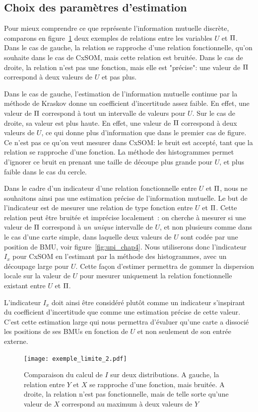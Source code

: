 \documentclass[../main]{subfiles}
\begin{document}
\subsection{Choix des paramètres d'estimation}

Pour mieux comprendre ce que représente l'information mutuelle discrète, comparons en figure~\ref{fig:exemple-limite} deux exemples de relations entre les variables $U$ et $\Pi$.
Dans le cas de gauche, la relation se rapproche d'une relation fonctionnelle, qu'on souhaite dans le cas de CxSOM, mais cette relation est bruitée. Dans le cas de droite, la relation n'est pas une fonction, mais elle est "précise": une valeur de $\Pi$ correspond à deux valeurs de $U$ et pas plus.

Dans le cas de gauche, l'estimation de l'information mutuelle continue par la méthode de Kraskov donne un coefficient d'incertitude assez faible. 
En effet, une valeur de $\Pi$ correspond à tout un intervalle de valeurs pour $U$. Sur le cas de droite, sa valeur est plus haute. En effet, une valeur de $\Pi$ correspond à deux valeurs de $U$, ce qui donne plus d'information que dans le premier cas de figure. Ce n'est pas ce qu'on veut mesurer dans CxSOM: le bruit est accepté, tant que la relation se rapproche d'une fonction.
La méthode des histogrammes permet d'ignorer ce bruit en prenant une taille de découpe plus grande pour $U$, et plus faible dans le cas du cercle.

Dans le cadre d'un indicateur d'une relation fonctionnelle entre $U$ et $\Pi$, nous ne souhaitons ainsi pas une estimation précise de l'information mutuelle.
Le but de l'indicateur est de mesurer une relation de type fonction entre $U$ et $\Pi$.
Cette relation peut être bruitée et imprécise localement~: on cherche à mesurer si une valeur de $\Pi$ correspond à \emph{un unique} intervalle de $U$, et non plusieurs comme dans le cas d'une carte simple, dans laquelle deux valeurs de $U$ sont codée par une position de BMU, voir figure~\ref{fig:upi_chap4}.
Nous utiliserons donc l'indicateur $I_x$ pour CxSOM en l'estimant par la méthode des histogrammes, avec un découpage large pour $U$. Cette façon d'estimer permettra de gommer la dispersion locale sur la valeur de $U$ pour mesurer uniquement la relation fonctionnelle existant entre $U$ et $\Pi$.

L'indicateur $I_x$ doit ainsi être considéré plutôt comme un indicateur s'inspirant du coefficient d'incertitude que comme une estimation précise de cette valeur. 
C'est cette estimation large qui nous permettra d'évaluer qu'une carte a dissocié les positions de ses BMUs en fonction de $U$ et non seulement de son entrée externe.
\begin{figure}
    \centering
    \texttt{[image: exemple\_limite\_2.pdf]}
    \caption{Comparaison du calcul de  $I$ sur deux distributions. A gauche, la relation entre $Y$ et $X$ se rapproche d'une fonction, mais bruitée. A droite, la relation n'est pas fonctionnelle, mais de telle sorte qu'une valeur de $X$ correspond au maximum à deux valeurs de $Y$}
    \label{fig:exemple-limite}
    \end{figure}
\end{document}
